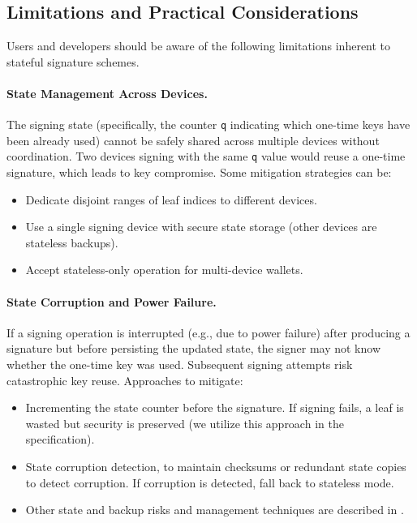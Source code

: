 \subsection{Limitations and Practical Considerations} 
Users and developers should be aware of the following limitations inherent to stateful signature schemes.

\paragraph{State Management Across Devices.} The signing state (specifically, the counter \texttt{q} indicating which one-time keys have been already used) cannot be safely shared across multiple devices without coordination. Two devices signing with the same \texttt{q} value would reuse a one-time signature, which leads to key compromise. Some mitigation strategies can be:
\begin{itemize}
    \item Dedicate disjoint ranges of leaf indices to different devices.
    \item Use a single signing device with secure state storage (other devices are stateless backups).
    \item Accept stateless-only operation for multi-device wallets.
\end{itemize}

\paragraph{State Corruption and Power Failure.}
If a signing operation is interrupted (e.g., due to power failure) after producing a signature but before persisting the updated state, the signer may not know whether the one-time key was used. Subsequent signing attempts risk catastrophic key reuse. Approaches to mitigate:
\begin{itemize}
    \item Incrementing the state counter before the signature. If signing fails, a leaf is wasted but security is preserved (we utilize this approach in the specification).
    \item State corruption detection, to maintain checksums or redundant state copies to detect corruption. If corruption is detected, fall back to stateless mode.
    \item Other state and backup risks and management techniques are described in \cite{draft-ietf-pquip-hbs-state-03}. 
\end{itemize}

